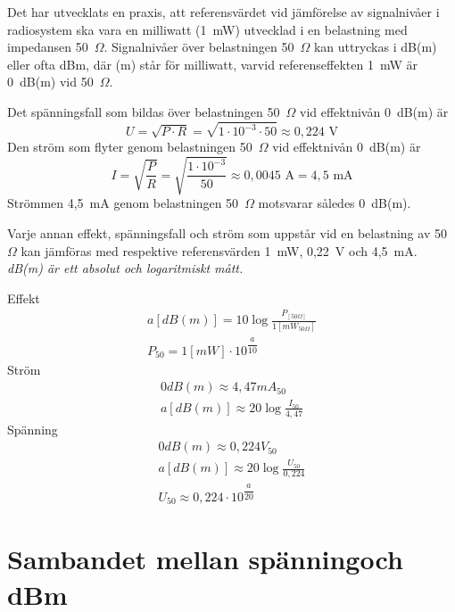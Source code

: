 Det har utvecklats en praxis, att referensvärdet vid jämförelse av signalnivåer
i radiosystem ska vara en milliwatt (1~mW) utvecklad i en belastning med
impedansen 50~\(\Omega\).
Signalnivåer över belastningen 50~\(\Omega\) kan uttryckas i dB(m) eller ofta
dBm, där (m) står för milliwatt, varvid referenseffekten 1~mW är 0~dB(m) vid
50~\(\Omega\).

Det spänningsfall som bildas över belastningen 50~\(\Omega\) vid effektnivån
0~dB(m) är
\[U = \sqrt{P\cdot R} = \sqrt{1\cdot 10^{-3} \cdot 50} \approx 0,224 \text{ V}\]
Den ström som flyter genom belastningen 50~\(\Omega\) vid effektnivån 0~dB(m)
är
\[
I = \sqrt{\frac{P}{R}} = \sqrt{\frac{1\cdot 10^{-3}}{50}} \approx 0,0045 \text{ A} = 4,5 \text{ mA}
\]
Strömmen 4,5~mA genom belastningen 50~\(\Omega\) motsvarar således 0~dB(m).

Varje annan effekt, spänningsfall och ström som uppstår vid en
belastning av 50 \(\Omega\) kan jämföras med respektive referensvärden 1~mW,
0,22~V och 4,5~mA. \emph{dB(m) är ett absolut och logaritmiskt mått.}

\vspace*{1ex}
\noindent
Effekt
\begin{gather*}
	a [dB(m)] = 10 \log\frac{P_{[50 \Omega]}}{1[mW_{50 \Omega}]} \\
	P_{50} = 1 [mW] \cdot 10^{\dfrac{a}{10}}
\end{gather*}
Ström
\begin{gather*}
	0 dB(m) \approx 4,47 mA_{50} \\
	a [dB(m)] \approx 20 \log\frac{I_{50}}{4,47}
\end{gather*}
Spänning
\begin{gather*}
	0 dB(m) \approx 0,224 V_{50} \\
	a [dB(m)] \approx 20 \log\frac{U_{50}}{0,224} \\
	U_{50} \approx 0,224 \cdot 10^{\dfrac{a}{20}}
\end{gather*}

\section[Sambandet spänning och dBm]{Sambandet mellan spänning\newline och dBm}

